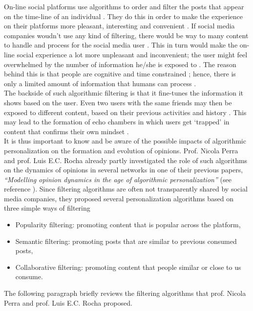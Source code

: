\documentclass[11 pt , letterpaper , twoside , openright]{book}
\begin{document}
On-line social platforms use algorithms to order and filter the posts that appear on the time-line of an individual \cite{Perra2019}. They do this in order to make the experience on their platforms more pleasant, interesting and convenient \cite{Perra2019}. If social media companies woudn't use any kind of filtering, there would be way to many content to handle and process for the social media user \cite{Bozdag2013}. This in turn would make the on-line social experience a lot more unpleasant and inconvenient; the user might feel overwhelmed by the number of information he/she is exposed to \cite{Bozdag2013}. The reason behind this is that people are cognitive and time constrained \cite{Perra2019}; hence, there is only a limited amount of information that humans can process \cite{Bozdag2013}.\\
\newline
The backside of such algorithmic filtering is that it fine-tunes the information it shows based on the user. Even two users with the same friends may then be exposed to different content, based on their previous activities and history \cite{Bozdag2013}. This may lead to the formation of echo chambers in which users get `trapped' in content that confirms their own mindset \cite{Bozdag2013}. \\
It is thus important to know and be aware of the possible impacts of algorithmic personalization on the formation and evolution of opinions. Prof. Nicola Perra and prof. Luis E.C. Rocha already partly investigated the role of such algorithms on the dynamics of opinions in several networks in one of their previous papers, \textit{``Modelling opinion dynamics in the age of algorithmic personalization''} (see reference \cite{Perra2019}). Since filtering algorithms are often not transparently shared by social media companies, they proposed several personalization algorithms based on three simple ways of filtering \cite{Perra2019}
\begin{itemize}
	\item Popularity filtering: promoting content that is popular across the platform,
	\item Semantic filtering: promoting posts that are similar to previous consumed posts,
	\item Collaborative filtering: promoting content that people similar or close to us consume.
\end{itemize} 
The following paragraph briefly reviews the filtering algorithms that prof. Nicola Perra and prof. Luis E.C. Rocha proposed. \\
\end{document}
